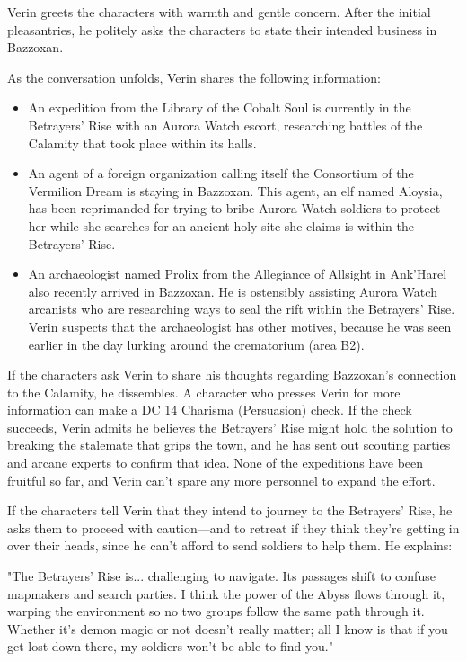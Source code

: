 \documentclass[a4paper, 11pt, bg=full, twocolumn, nooutline]{dndbook}
\begin{document}
Verin greets the characters with warmth and gentle concern. After the initial pleasantries, he politely asks the characters to state their intended business in Bazzoxan.

As the conversation unfolds, Verin shares the following information:

\begin{itemize}
\item An expedition from the Library of the Cobalt Soul is currently in the Betrayers' Rise with an Aurora Watch escort, researching battles of the Calamity that took place within its halls.
\item An agent of a foreign organization calling itself the Consortium of the Vermilion Dream is staying in Bazzoxan. This agent, an elf named Aloysia, has been reprimanded for trying to bribe Aurora Watch soldiers to protect her while she searches for an ancient holy site she claims is within the Betrayers' Rise.
\item An archaeologist named Prolix from the Allegiance of Allsight in Ank'Harel also recently arrived in Bazzoxan. He is ostensibly assisting Aurora Watch arcanists who are researching ways to seal the rift within the Betrayers' Rise. Verin suspects that the archaeologist has other motives, because he was seen earlier in the day lurking around the crematorium (area B2).
\end{itemize}

If the characters ask Verin to share his thoughts regarding Bazzoxan's connection to the Calamity, he dissembles. A character who presses Verin for more information can make a DC 14 Charisma (Persuasion) check. If the check succeeds, Verin admits he believes the Betrayers' Rise might hold the solution to breaking the stalemate that grips the town, and he has sent out scouting parties and arcane experts to confirm that idea. None of the expeditions have been fruitful so far, and Verin can't spare any more personnel to expand the effort.

If the characters tell Verin that they intend to journey to the Betrayers' Rise, he asks them to proceed with caution---and to retreat if they think they're getting in over their heads, since he can't afford to send soldiers to help them. He explains:

\begin{DndReadAloud}
"The Betrayers' Rise is... challenging to navigate. Its passages shift to confuse mapmakers and search parties. I think the power of the Abyss flows through it, warping the environment so no two groups follow the same path through it. Whether it's demon magic or not doesn't really matter; all I know is that if you get lost down there, my soldiers won't be able to find you."
\end{DndReadAloud}
\end{document}
